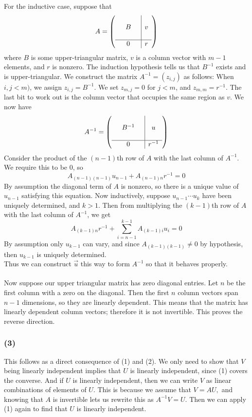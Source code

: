 \documentclass{article}
\begin{document}
For the inductive case, suppose that 
\[A=\left(
\begin{array}{ccc|c}
& && \\
&B&&v\\
& && \\
\hline
&0&&r
\end{array}
\right)\]
where $B$ is some upper-triangular matrix, $v$ is a column vector with $m-1$
elements, and $r$ is nonzero. The induction hypothesis tells us that $B^{-1}$
exists and is upper-triangular. We construct the matrix $A^{-1} = (z_{i,j})$
as follows:
When $i,j < m)$, we assign $z_{i,j} = B^{-1}.$ We set $z_{m,j}=0$ for $j < m$,
and $z_{m,m} = r^{-1}.$ The last bit to work out is the column vector that
occupies the same region as $v.$
We now have
\[A^{-1}=\left(
\begin{array}{ccc|c}
& && \\
&B^{-1}&&u\\
& && \\
\hline
&0&&r^{-1}
\end{array}
\right)\]
Consider the product of the $(n-1)$th row of $A$ with the last column of $A^{-1}$. We require this to be 0, so 
\[A_{(n-1)(n-1)}u_{n-1} + A_{(n-1)n}r^{-1} = 0\]
By assumption the diagonal term of $A$ is nonzero, so there is a unique value of $u_{n-1}$ satisfying this equation. 
Now inductively, suppose $u_{n-1}\cdots u_k$ have been uniquely determined, and $k > 1$. Then from multiplying the $(k-1)$th row of $A$ with the last column of $A^{-1}$, we get
\[A_{(k-1)n}r^{-1}+\sum_{i=n-1}^{k-1} A_{(k-1)i} u_i=0\]
By assumption only $u_{k-1}$ can vary, and since $A_{(k-1)(k-1)}\neq 0$ by hypothesis, then $u_{k-1}$ is uniquely determined. 
\\Thus we can construct $\vec{u}$ this way to form $A^{-1}$ so that it behaves properly. 
\\\\Now suppose our upper triangular matrix has zero diagonal entries. Let $n$ be the first column with a zero on the diagonal. Then the first $n$ column vectors span $n-1$ dimensions, so they are linearly dependent. This means that the matrix has linearly dependent column vectors; therefore it is not invertible. This proves the reverse direction. 


\subsubsection{(3)}
This follows as a direct consequence of (1) and (2). We only need to show that
$V$ being linearly independent implies that $U$ is linearly independent, since
(1) covers the converse. And if $U$ is linearly independent, then we can write
$V$ as linear combinations of elements of $U$. This is because we assume that
$V = AU,$ and knowing that $A$ is invertible lets us rewrite this as 
$A^{-1}V = U$.
Then we can apply (1) again to find that $U$ is linearly independent.
\end{document}
